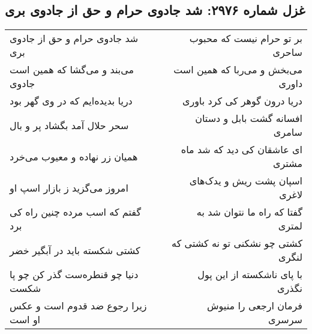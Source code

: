\begin{center}
\section*{غزل شماره ۲۹۷۶: شد جادوی حرام و حق از جادوی بری}
\label{sec:2976}
\begin{longtable}{l p{0.5cm} r}
شد جادوی حرام و حق از جادوی بری
&&
بر تو حرام نیست که محبوب ساحری
\\
می‌بند و می‌گشا که همین است جادوی
&&
می‌بخش و می‌ربا که همین است داوری
\\
دریا بدیده‌ایم که در وی گهر بود
&&
دریا درون گوهر کی کرد باوری
\\
سحر حلال آمد بگشاد پر و بال
&&
افسانه گشت بابل و دستان سامری
\\
همیان زر نهاده و معیوب می‌خرد
&&
ای عاشقان کی دید که شد ماه مشتری
\\
امروز می‌گزید ز بازار اسپ او
&&
اسپان پشت ریش و یدک‌های لاغری
\\
گفتم که اسب مرده چنین راه کی برد
&&
گفتا که راه ما نتوان شد به لمتری
\\
کشتی شکسته باید در آبگیر خضر
&&
کشتی چو نشکنی تو نه کشتی که لنگری
\\
دنیا چو قنطره‌ست گذر کن چو پا شکست
&&
با پای ناشکسته از این پول نگذری
\\
زیرا رجوع ضد قدوم است و عکس او است
&&
فرمان ارجعی را منیوش سرسری
\\
\end{longtable}
\end{center}
